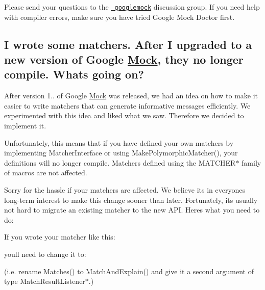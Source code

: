 Please send your questions to the \href{http://groups.google.com/group/googlemock}\texttt{ googlemock} discussion group. If you need help with compiler errors, make sure you have tried Google Mock Doctor first.

\subsection*{I wrote some matchers. After I upgraded to a new version of Google \mbox{\hyperlink{class_mock}{Mock}}, they no longer compile. What\textquotesingle{}s going on?}

After version 1.. of Google \mbox{\hyperlink{class_mock}{Mock}} was released, we had an idea on how to make it easier to write matchers that can generate informative messages efficiently. We experimented with this idea and liked what we saw. Therefore we decided to implement it.

Unfortunately, this means that if you have defined your own matchers by implementing {\ttfamily Matcher\+Interface} or using {\ttfamily Make\+Polymorphic\+Matcher()}, your definitions will no longer compile. Matchers defined using the {\ttfamily M\+A\+T\+C\+H\+E\+R$\ast$} family of macros are not affected.

Sorry for the hassle if your matchers are affected. We believe it\textquotesingle{}s in everyone\textquotesingle{}s long-\/term interest to make this change sooner than later. Fortunately, it\textquotesingle{}s usually not hard to migrate an existing matcher to the new A\+PI. Here\textquotesingle{}s what you need to do\+:

If you wrote your matcher like this\+: 
\begin{DoxyCode}{0}
\DoxyCodeLine{  \}}
\DoxyCodeLine{\};}
\end{DoxyCode}


you\textquotesingle{}ll need to change it to\+: 
\begin{DoxyCode}{0}
\DoxyCodeLine{  \}}
\DoxyCodeLine{\};}
\end{DoxyCode}
 (i.\+e. rename {\ttfamily Matches()} to {\ttfamily Match\+And\+Explain()} and give it a second argument of type {\ttfamily Match\+Result\+Listener$\ast$}.)

